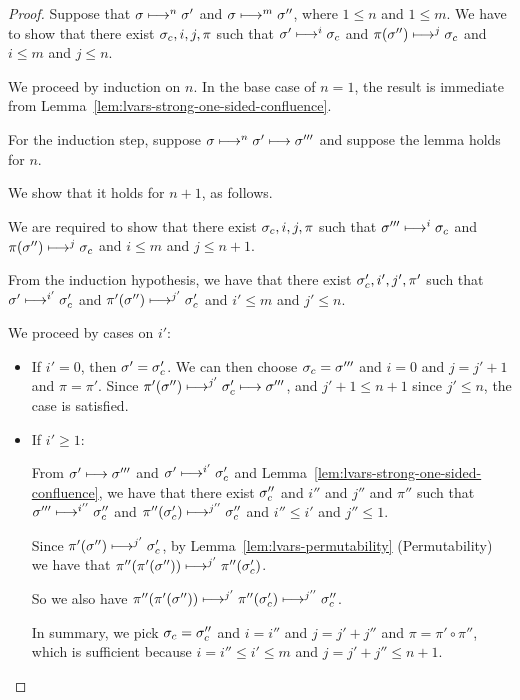 \begin{proof}
  Suppose that $\sigma \longmapsto^n \sigma'$ and $\sigma \longmapsto^m
  \sigma''$, where $1 \leq n$ and $1 \leq m$.  We have to show that
  there exist $\sigma_c, i, j, \pi$ such that $\sigma' \longmapsto^i
  \sigma_c$ and $\pi(\sigma'') \longmapsto^j \sigma_c$ and $i \leq m$ and
  $j \leq n$.

  We proceed by induction on $n$.  In the base case of $n = 1$, the
  result is immediate from
  Lemma~\ref{lem:lvars-strong-one-sided-confluence}.

  For the induction step, suppose $\sigma \longmapsto^n \sigma'
  \longmapsto \sigma'''$ and suppose the lemma holds for $n$.

  We show that it holds for $n + 1$, as follows.

  We are required to show that there exist $\sigma_c, i, j, \pi$ such
  that $\sigma''' \longmapsto^i \sigma_c$ and $\pi(\sigma'')
  \longmapsto^j \sigma_c$ and $i \leq m$ and $j \leq n + 1$.

  From the induction hypothesis, we have that there exist $\sigma'_c,
  i', j', \pi'$ such that $\sigma' \longmapsto^{i'} \sigma'_c$ and
  $\pi'(\sigma'') \longmapsto^{j'} \sigma'_c$ and $i' \leq m$ and $j'
  \leq n$.

  We proceed by cases on $i'$:
  \begin{itemize}

  \item If $i' = 0$, then $\sigma' = \sigma_c'$.  We can then choose
    $\sigma_c = \sigma'''$ and $i = 0$ and $j = j' + 1$ and $\pi =
    \pi'$.  Since $\pi'(\sigma'') \longmapsto^{j'} \sigma'_c \longmapsto
    \sigma'''$, and $j' + 1 \leq n + 1$ since $j' \leq n$, the case is
    satisfied.

  \item If $i' \geq 1$:

    From $\sigma' \longmapsto \sigma'''$ and $\sigma' \longmapsto^{i'}
    \sigma_c'$ and Lemma~\ref{lem:lvars-strong-one-sided-confluence},
    we have that there exist $\sigma_c''$ and $i''$ and $j''$ and
    $\pi''$ such that $\sigma''' \longmapsto^{i''} \sigma_c''$ and
    $\pi''(\sigma_c') \longmapsto^{j''} \sigma_c''$ and $i'' \leq i'$
    and $j'' \leq 1$.

    Since $\pi'(\sigma'') \longmapsto^{j'} \sigma'_c$, by
    Lemma~\ref{lem:lvars-permutability} (Permutability) we have that
    $\pi''(\pi'(\sigma'')) \longmapsto^{j'} \pi''(\sigma'_c)$.

    So we also have $\pi''(\pi'(\sigma'')) \longmapsto^{j'}
    \pi''(\sigma'_c) \longmapsto^{j''} \sigma_c''$.

    In summary, we pick $\sigma_c = \sigma_c''$ and $i = i''$ and $j =
    j' + j''$ and $\pi = \pi' \circ \pi''$, which is sufficient
    because $i = i'' \leq i' \leq m$ and $j = j' + j'' \leq n + 1$.
  \end{itemize}

\end{proof}
